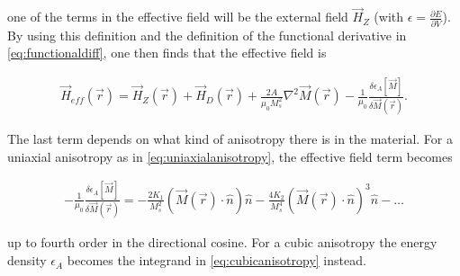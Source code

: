 \documentclass[1p]{elsarticle}		%
\numberwithin{equation}{section}
\begin{document}
one of the terms in the effective field will be the external field $\vec{H}_Z$ (with $\epsilon = \frac{\partial E}{\partial V}$). By using this definition and the definition of the functional derivative in \eqref{eq:functionaldiff}, one then finds that the effective field is

\begin{align}
\label{eq:effectivefield}
\vec{H}_{eff}(\vec{r}) = \vec{H}_Z(\vec{r}) + \vec{H}_D(\vec{r}) + \frac{2A}{\mu_0M_s^2}\nabla^2\vec{M}(\vec{r}) -\frac{1}{\mu_0}\frac{\delta \epsilon_A[\vec{M}]}{\delta \vec{M}(\vec{r})}.
\end{align}

The last term depends on what kind of anisotropy there is in the material. For a uniaxial anisotropy as in \eqref{eq:uniaxialanisotropy}, the effective field term becomes 

\begin{align}
\label{eq:effielduniaxialani}
-\frac{1}{\mu_0}\frac{\delta \epsilon_A[\vec{M}]}{\delta \vec{M}(\vec{r})} = -\frac{2K_1}{M_s^2}(\vec{M}(\vec{r})\cdot\hat{n})\hat{n} - \frac{4K_2}{M_s^4}(\vec{M}(\vec{r})\cdot\hat{n})^3\hat{n} - \ldots
\end{align}

up to fourth order in the directional cosine. For a cubic anisotropy the energy density $\epsilon_A$ becomes the integrand in \eqref{eq:cubicanisotropy} instead.
\end{document}
